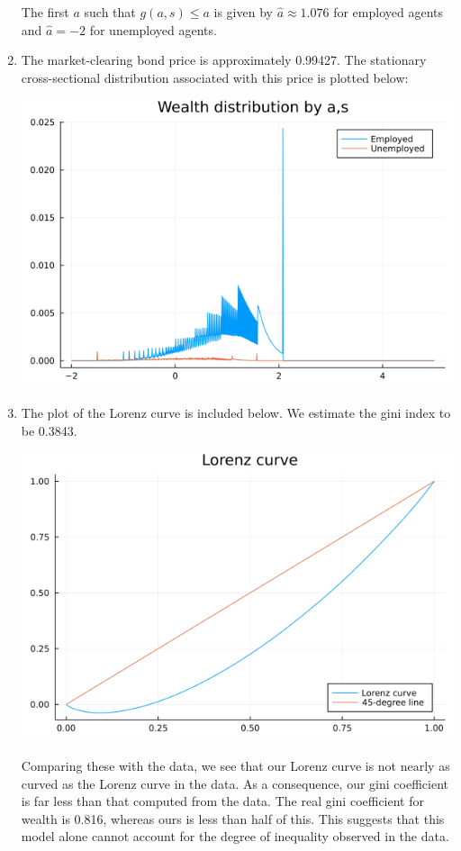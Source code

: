\documentclass[12pt]{article}
\begin{document}
\begin{enumerate}[label=\alph*) ]
    The first $a$ such that $g(a, s) \leq a$ is given by $\hat{a} \approx 1.076$ for employed agents and $\hat{a} =-2$ for unemployed agents.
    \item The market-clearing bond price is approximately 0.99427. The stationary cross-sectional distribution associated with this price is plotted below:
    \begin{center}
        \includegraphics[scale=0.5]{wealthplot.png}
    \end{center}
    \item The plot of the Lorenz curve is included below. We estimate the gini index to be 0.3843. 
    \begin{center}
        \includegraphics[scale=0.5]{lorenzplot.png}
    \end{center}
    Comparing these with the data, we see that our Lorenz curve is not nearly as curved as the Lorenz curve in the data. As a consequence, our gini coefficient is far less than that computed from the data. The real gini coefficient for wealth is 0.816, whereas ours is less than half of this. This suggests that this model alone cannot account for the degree of inequality observed in the data.
\end{enumerate}
\end{document}
